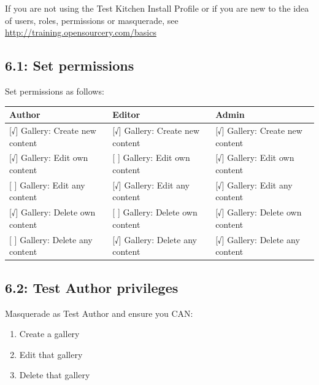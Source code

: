 \documentclass[letterpaper,10pt,english]{sphinxmanual}
\begin{document}
If you are not using the Test Kitchen Install Profile or if you are new to the idea of users, roles, permissions or masquerade, see \href{http://training.opensourcery.com/basics}{http://training.opensourcery.com/basics}


\subsection{6.1: Set permissions}
\label{slides:set-permissions}
Set permissions as follows:

\begin{tabulary}{\linewidth}{|L|L|L|}
\hline
\textbf{
Author
} & \textbf{
Editor
} & \textbf{
Admin
}\\\hline

{[}√{]} Gallery: Create new content
 & 
{[}√{]} Gallery: Create new content
 & 
{[}√{]} Gallery: Create new content
\\\hline

{[}√{]}  Gallery: Edit own content
 & 
{[} {]}  Gallery: Edit own content
 & 
{[}√{]} Gallery: Edit own content
\\\hline

{[} {]}   Gallery: Edit any content
 & 
{[}√{]} Gallery: Edit any content
 & 
{[}√{]} Gallery: Edit any content
\\\hline

{[}√{]}  Gallery: Delete own content
 & 
{[} {]}  Gallery: Delete own content
 & 
{[}√{]} Gallery: Delete own content
\\\hline

{[} {]}   Gallery: Delete any content
 & 
{[}√{]}  Gallery: Delete any content
 & 
{[}√{]} Gallery: Delete any content
\\\hline
\end{tabulary}



\subsection{6.2: Test Author privileges}
\label{slides:test-author-privileges}
Masquerade as Test Author and ensure you CAN:
\begin{enumerate}
\item {} 
Create a gallery

\item {} 
Edit that gallery

\item {} 
Delete that gallery

\end{enumerate}
\end{document}
